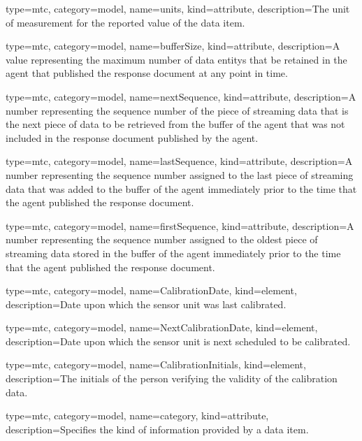 {
  type=mtc,
  category=model,
  name={units},
  kind={attribute},
  description={The unit of measurement for the reported value of the data item.}
}



{
  type=mtc,
  category=model,
  name={bufferSize},
  kind={attribute},
  description={A value representing the maximum number of \glspl{data entity} that \MAY be retained in the \gls{agent} that published the \gls{response document} at any point in time.}
}


{
  type=mtc,
  category=model,
  name={nextSequence},
  kind={attribute},
  description={A number representing the sequence number of the piece of \gls{streaming data} that is the next piece of data to be retrieved from the buffer of the \gls{agent} that was not included in the \gls{response document} published by the \gls{agent}.}
}

{
  type=mtc,
  category=model,
  name={lastSequence},
  kind={attribute},
  description={A number representing the sequence number assigned to the last piece of \gls{streaming data} that was added to the buffer of the \gls{agent} immediately prior to the time that the \gls{agent} published the \gls{response document}.}
}

{
  type=mtc,
  category=model,
  name={firstSequence},
  kind={attribute},
  description={A number representing the sequence number assigned to the oldest piece of \gls{streaming data} stored in the buffer of the \gls{agent} immediately prior to the time that the \gls{agent} published the \gls{response document}.}
}


{
  type=mtc,
  category=model,
  name={CalibrationDate},
  kind={element},
  description={Date upon which the \gls{sensor unit} was last calibrated. }
}


{
  type=mtc,
  category=model,
  name={NextCalibrationDate},
  kind={element},
  description={Date upon which the sensor unit is next scheduled to be calibrated. }
}


{
  type=mtc,
  category=model,
  name={CalibrationInitials},
  kind={element},
  description={The initials of the person verifying the validity of the calibration data.}
}


{
  type=mtc,
  category=model,
  name={category},
  kind={attribute},
  description={Specifies the kind of information provided by a data item. }
}


